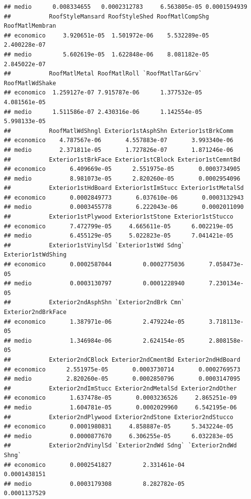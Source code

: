 \documentclass[
]{article}
\begin{document}
\begin{verbatim}
## medio      0.008334655   0.0002312783     6.563805e-05 0.0001594939
##           RoofStyleMansard RoofStyleShed RoofMatlCompShg RoofMatlMembran
## economico     3.920651e-05  1.501972e-06    5.532289e-05    2.400228e-07
## medio         5.602619e-05  1.622848e-06    8.081182e-05    2.845022e-07
##           RoofMatlMetal RoofMatlRoll `RoofMatlTar&Grv` RoofMatlWdShake
## economico  1.259127e-07 7.915787e-06      1.377532e-05    4.081561e-05
## medio      1.511586e-07 2.430316e-06      1.142554e-05    5.998133e-05
##           RoofMatlWdShngl Exterior1stAsphShn Exterior1stBrkComm
## economico    4.787567e-06       4.557883e-07       3.993340e-06
## medio        2.371811e-05       1.727826e-07       1.871246e-06
##           Exterior1stBrkFace Exterior1stCBlock Exterior1stCemntBd
## economico       6.409669e-05      2.551975e-05       0.0003734905
## medio           8.981073e-05      2.820260e-05       0.0002954096
##           Exterior1stHdBoard Exterior1stImStucc Exterior1stMetalSd
## economico       0.0002849773       6.037610e-06       0.0003132943
## medio           0.0003455778       6.222043e-06       0.0002011090
##           Exterior1stPlywood Exterior1stStone Exterior1stStucco
## economico       7.472799e-05     4.665611e-05      6.002219e-05
## medio           6.455129e-05     5.022823e-05      7.041421e-05
##           Exterior1stVinylSd `Exterior1stWd Sdng` Exterior1stWdShing
## economico       0.0002587044         0.0002775036       7.058473e-05
## medio           0.0003130797         0.0001228940       7.230134e-05
##           Exterior2ndAsphShn `Exterior2ndBrk Cmn` Exterior2ndBrkFace
## economico       1.387971e-06         2.479224e-05       3.718113e-05
## medio           1.346984e-06         2.624154e-05       2.808158e-05
##           Exterior2ndCBlock Exterior2ndCmentBd Exterior2ndHdBoard
## economico      2.551975e-05       0.0003730714       0.0002769573
## medio          2.820260e-05       0.0002850796       0.0003147095
##           Exterior2ndImStucc Exterior2ndMetalSd Exterior2ndOther
## economico       1.637478e-05       0.0003236526     2.865251e-09
## medio           1.604781e-05       0.0002029960     6.542195e-06
##           Exterior2ndPlywood Exterior2ndStone Exterior2ndStucco
## economico       0.0001980831     4.858887e-05      5.343224e-05
## medio           0.0000877670     6.306255e-05      6.032283e-05
##           Exterior2ndVinylSd `Exterior2ndWd Sdng` `Exterior2ndWd Shng`
## economico       0.0002541827         2.331461e-04         0.0001438151
## medio           0.0003179308         8.282782e-05         0.0001137529

\end{verbatim}
\end{document}
